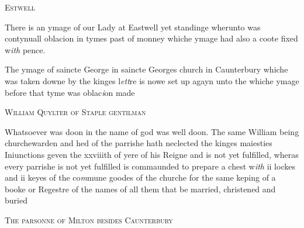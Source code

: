 \documentclass[12pt, a4paper]{book}
\begin{document}
 
	
           
               
				\begin{center} \begin{large} {\scshape Estwell} \end{large} \end{center}
			
		
			
				\marginpar[\vspace{0.5cm}{\textcolor{Gray}{Images}}]{}
			
			
		\ifthenelse{\isodd{\thepage}}
		{\reversemarginpar}
		{\normalmarginpar}
		There is an ymage of our Lady at Eastwell yet standinge wherunto was
		 contynuall oblacion in tymes past of monney whiche ymage had also a
		 coote fixed w\textit{ith} pence.
			
		\ifthenelse{\isodd{\thepage}}
		{\reversemarginpar}
		{\normalmarginpar}
		The ymage of saincte George in saincte Georges church in Caunterbury
		 whiche was taken downe by the kinges l\textit{ett}re is nowe set up agayn
		 unto the whiche ymage before that tyme was oblac\textit{i}on made
		
	
            
            	
				\begin{center} \begin{large} {\scshape William Quylter of Staple gentilman} \end{large} \end{center}
			

		 
		 	
				\marginpar[\vspace{0.5cm}{\textcolor{Gray}{Injunctions n}}]{}
			
		 	
		\ifthenelse{\isodd{\thepage}}
		{\reversemarginpar}
		{\normalmarginpar}
		Whatsoever was doon in the name of god was well doon.
		 		The same William being churchewarden and hed of the parrishe hath
		 neclected the kinges maiesties Iniunctions geven the xxviiith of yere
		 of his Reigne and is not yet fulfilled, wheras every parrishe is
		 not yet fulfilled is commaunded to prepare a chest w\textit{ith} ii lockes
		 and ii keyes of the co\textit{m}mune goodes of the churche for the same keping
		 of a booke or Regestre of the names of all them that be married,
		 christened and buried
		 
	
            
            	
				\begin{center} \begin{large} {\scshape The parsonne of Milton besides Caunterbury} \end{large} \end{center}
			
\end{document}
